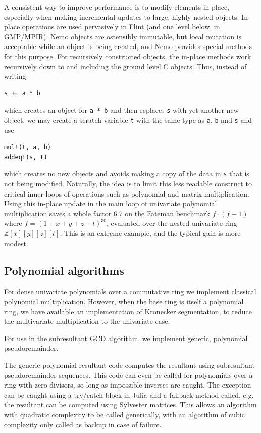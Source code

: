 \documentclass{sig-alternate-05-2015}
\begin{document}
A consistent way to improve performance is to modify
elements in-place, especially when making incremental updates
to large, highly nested objects.
In-place operations are used pervasively in Flint (and one level below, in GMP/MPIR).
Nemo objects are ostensibly immutable, but local mutation is
acceptable while an object is being created,
and Nemo provides special methods for this purpose.
For recursively constructed objects, the in-place methods work
recursively down to and including the ground level C objects.
Thus, instead of writing
\begin{verbatim}
s += a * b
\end{verbatim}
which creates an object for \texttt{a * b}
and then replaces \texttt{s} with yet another new object, we may
create a scratch variable \texttt{t} with the same type as \texttt{a}, \texttt{b} and \texttt{s} and use
\begin{verbatim}
mul!(t, a, b)
addeq!(s, t)
\end{verbatim}
which creates no new objects and avoids making a copy of the data in \texttt{s}
that is not being modified.
Naturally, the idea is to limit this less readable construct to
critical inner loops of operations such as polynomial
and matrix multiplication.
Using this in-place update in the main loop of univariate polynomial
multiplication saves a whole factor 6.7 on the Fateman benchmark
$f \cdot (f+1)$ where
$f = (1 + x + y + z + t)^{30}$, evaluated over the nested univariate
ring $\mathbb{Z}[x][y][z][t]$. This is an extreme example, and
the typical gain is more modest.

\subsection{Polynomial algorithms}

For dense univariate polynomials over a commutative ring we implement classical
polynomial multiplication. However, when the base ring is itself a polynomial ring,
we have available an implementation of Kronecker segmentation, to reduce the
multivariate multiplication to the univariate case.

For use in the subresultant GCD algorithm, we implement generic, polynomial
pseudoremainder. 

The generic polynomial resultant code computes the resultant using subresultant
pseudoremainder sequences. This code can even be called for polynomials over a
ring with zero divisors, so long as impossible inverses are caught. The exception
can be caught using a try/catch block in Julia and a fallback method called, e.g.
the resultant can be computed using Sylvester matrices. This allows an algorithm
with quadratic complexity to be called generically, with an algorithm of cubic
complexity only called as backup in case of failure.
\end{document}
